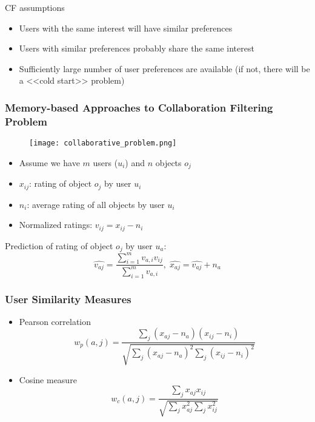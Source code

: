 CF assumptions
\begin{itemize}
\item Users with the same interest will have similar preferences
\item Users with similar preferences probably share the same interest
\item Sufficiently large number of user preferences are available (if not, there will be a <<cold start>> problem)
\end{itemize}


\newpage
\subsubsection{Memory-based Approaches to Collaboration Filtering Problem}

\begin{multicols}{2}

\begin{figure}[H]
    \centering
    \texttt{[image: collaborative\_problem.png]}
\end{figure}

\columnbreak

\begin{itemize}
\item Assume we have $m$ users ($u_i$) and $n$ objects $o_j$
\item $x_{ij}$: rating of object $o_j$ by user $u_i$
\item $n_i$: average rating of all objects by user $u_i$ 
\item Normalized ratings: $v_{ij} = x_{ij} - n_i$
\end{itemize}
\end{multicols}

Prediction of rating of object $o_j$ by user $u_a$:
\begin{equation*}
\hat{v_{aj}} = \frac{\sum\limits_{i=1}^m v_{a,i} v_{ij}}{\sum\limits_{i=1}^m v_{a,i}}, \;\hat{x_{aj}} = \hat{v_{aj}} + n_a
\end{equation*}



\subsubsection{User Similarity Measures}
\begin{itemize}
\item Pearson correlation
\begin{equation*}
w_p(a, j) = \frac{\sum_j (x_{aj} - n_a)(x_{ij} - n_i)}{\sqrt{\sum_j (x_{aj} - n_a)^2 \sum_j(x_{ij} - n_i)^2}}
\end{equation*}

\item Cosine measure
\begin{equation*}
w_c(a, j) = \frac{\sum_j x_{aj} x_{ij}}{\sqrt{\sum_j x_{aj}^2 \sum_j x_{ij}^2}}
\end{equation*}
\end{itemize}


